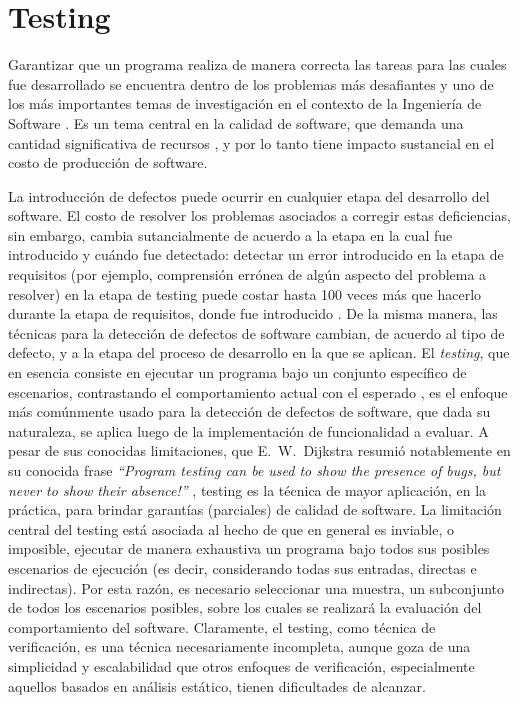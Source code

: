 \chapter[Testing]{Testing}
\label{cap:preliminares.testing}

Garantizar que un programa realiza de manera correcta las tareas para las cuales fue desarrollado se encuentra dentro de los problemas m\'as desafiantes y uno de los m\'as importantes temas de investigaci\'on en el contexto de la Ingenier\'ia de Software \cite{bibliography.books.GhezziBook,bibliography.books.PressmanBook,DBLP:series/txcs/Jalote05}. Es un tema central en la calidad de software, que demanda una cantidad significativa de recursos \cite{bibliography.books.JaloteBook}, y por lo tanto tiene impacto sustancial en el costo de producci\'on de software. 

La introducci\'on de defectos puede ocurrir en cualquier etapa del desarrollo del software. El costo de resolver los problemas asociados a corregir estas deficiencias, sin embargo, cambia sutancialmente de acuerdo a la etapa en la cual fue introducido y cu\'ando fue detectado: detectar un error introducido en la etapa de requisitos (por ejemplo, comprensi\'on err\'onea de alg\'un aspecto del problema a resolver) en la etapa de testing puede costar hasta 100 veces m\'as que hacerlo durante la etapa de requisitos, donde fue introducido \cite{bibliography.books.JaloteBook}. De la misma manera, las t\'ecnicas para la detecci\'on de defectos de software cambian, de acuerdo al tipo de defecto, y a la etapa del proceso de desarrollo en la que se aplican. El \emph{testing}, que en esencia consiste en ejecutar un programa bajo un conjunto espec\'ifico de escenarios, contrastando el comportamiento actual con el esperado \cite{bibliography.books.AmmannOffutt}, es el enfoque m\'as com\'unmente usado para la detecci\'on de defectos de software, que dada su naturaleza, se aplica luego de la implementaci\'on de funcionalidad a evaluar. A pesar de sus conocidas limitaciones, que E.~W.~Dijkstra resumi\'o notablemente en su conocida frase \emph{``Program testing can be used to show the presence of bugs, but never to show their absence!''} \cite{Dijkstra:1972:CIN:1243380.1243381}, testing es la t\'ecnica de mayor aplicaci\'on, en la pr\'actica, para brindar garant\'ias (parciales) de calidad de software. La limitaci\'on central del testing est\'a asociada al hecho de que en general es inviable, o imposible, ejecutar de manera exhaustiva un programa bajo todos sus posibles escenarios de ejecuci\'on (es decir, considerando todas sus entradas, directas e indirectas). Por esta raz\'on, es necesario seleccionar una muestra, un subconjunto de todos los escenarios posibles, sobre los cuales se realizar\'a la evaluaci\'on del comportamiento del software. Claramente, el testing, como t\'ecnica de verificaci\'on, es una t\'ecnica necesariamente incompleta, aunque goza de una simplicidad y escalabilidad que otros enfoques de verificaci\'on, especialmente aquellos basados en an\'alisis est\'atico, tienen dificultades de alcanzar.

